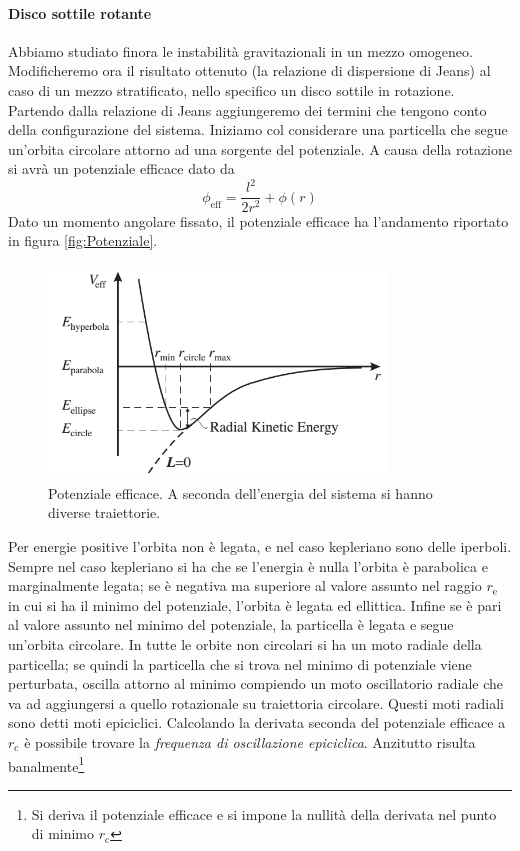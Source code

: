 \paragraph{Disco sottile rotante}
Abbiamo studiato finora le instabilità gravitazionali in un mezzo omogeneo. Modificheremo ora il risultato ottenuto (la relazione di dispersione di Jeans) al caso di un mezzo stratificato, nello specifico un disco sottile in rotazione. Partendo dalla relazione di Jeans aggiungeremo dei termini che tengono conto della configurazione del sistema. 
Iniziamo col considerare una particella che segue un'orbita circolare attorno ad una sorgente del potenziale. A causa della rotazione si avrà un potenziale efficace dato da
\begin{equation}
\phi_\mathrm{eff} = \dfrac{l^2}{2r^2} + \phi(r)
\end{equation}
Dato un momento angolare fissato, il potenziale efficace ha l'andamento riportato in figura \ref{fig:Potenziale}.
\begin{figure}
\begin{center}
\includegraphics[width=0.8\textwidth]{img/Potenziale}
\caption{Potenziale efficace. A seconda dell'energia del sistema si hanno diverse traiettorie.}
\end{center}
\end{figure}
Per energie positive l'orbita non è legata, e nel caso kepleriano sono delle iperboli. Sempre nel caso kepleriano si ha che se l'energia è nulla l'orbita è parabolica e marginalmente legata; se è negativa ma superiore al valore assunto nel raggio $r_\mathrm{e}$ in cui si ha il minimo del potenziale, l'orbita è legata ed ellittica. Infine se è pari al valore assunto nel minimo del potenziale, la particella è legata e segue un'orbita circolare. In tutte le orbite non circolari si ha un moto radiale della particella; se quindi la particella che si trova nel minimo di potenziale viene perturbata, oscilla attorno al minimo compiendo un moto oscillatorio radiale che va ad aggiungersi a quello rotazionale su traiettoria circolare. Questi moti radiali sono detti moti epiciclici. Calcolando la derivata seconda del potenziale efficace a $r_\mathrm{c}$ è possibile trovare la \textit{frequenza di oscillazione epiciclica}. Anzitutto risulta banalmente\footnote{Si deriva il potenziale efficace e si impone la nullità della derivata nel punto di minimo $r_\mathrm{c}$} 
